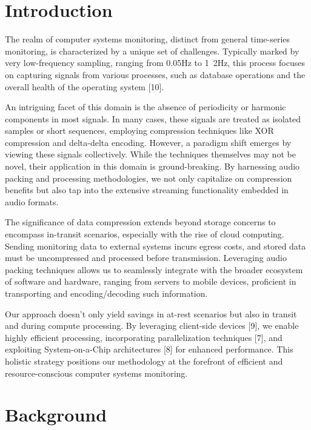 \documentclass[conference]{IEEEtran}
\begin{document}
\section{Introduction}
The realm of computer systems monitoring, distinct from general time-series monitoring, is characterized by a unique set of challenges. Typically marked by very low-frequency sampling, ranging from 0.05Hz to 1~2Hz, this process focuses on capturing signals from various processes, such as database operations and the overall health of the operating system [10]. 
 
An intriguing facet of this domain is the absence of periodicity or harmonic components in most signals. In many cases, these signals are treated as isolated samples or short sequences, employing compression techniques like XOR compression and delta-delta encoding. 
However, a paradigm shift emerges by viewing these signals collectively. While the techniques themselves may not be novel, their application in this domain is ground-breaking. By harnessing audio packing and processing methodologies, we not only capitalize on compression benefits but also tap into the extensive streaming functionality embedded in audio formats. 
 
The significance of data compression extends beyond storage concerns to encompass in-transit scenarios, especially with the rise of cloud computing. Sending monitoring data to external systems incurs egress costs, and stored data must be uncompressed and processed before transmission. Leveraging audio packing techniques allows us to seamlessly integrate with the broader ecosystem of software and hardware, ranging from servers to mobile devices, proficient in transporting and encoding/decoding such information. 


Our approach doesn't only yield savings in at-rest scenarios but also in transit and during compute processing. By leveraging client-side devices [9], we enable highly efficient processing, incorporating parallelization techniques [7], and exploiting System-on-a-Chip architectures [8] for enhanced performance. This holistic strategy positions our methodology at the forefront of efficient and resource-conscious computer systems monitoring. 

\section{Background}
\end{document}
